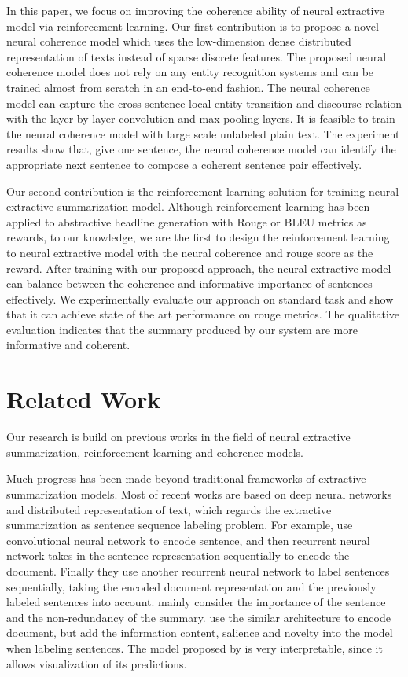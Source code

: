\documentclass[letterpaper]{article} %
\begin{document}
	In this paper, we focus on improving the coherence ability of neural extractive model via reinforcement learning. Our first contribution is to propose a novel neural coherence model which uses the low-dimension dense distributed representation of texts instead of sparse discrete features. The proposed neural coherence model does not rely on any entity recognition systems and can be trained almost from scratch in an end-to-end fashion. The neural coherence model can capture the cross-sentence local entity transition and discourse relation with the layer by layer convolution and max-pooling layers. It is feasible to train the neural coherence model with large scale unlabeled plain text. The experiment results show that, give one sentence, the neural coherence model can identify the appropriate next sentence to compose a coherent sentence pair effectively. 
	
	
	Our second contribution is the reinforcement learning solution for training neural extractive summarization model. Although reinforcement learning has been applied to abstractive headline generation with Rouge or BLEU metrics as rewards\cite{socher2017_summarization,ayana2016}, to our knowledge, we are the first to design the reinforcement learning to neural extractive model with the neural coherence and rouge score as the reward. After training with our proposed approach, the neural extractive model can balance between the coherence and informative importance of sentences effectively. We experimentally evaluate our approach on standard task and show that it can achieve state of the art performance on rouge metrics. The qualitative evaluation indicates that the summary produced by our system are more informative and coherent.
	
	
	\section{Related Work}
	Our research is build on previous works in the field of neural extractive summarization, reinforcement learning and coherence models.
	
	Much progress has been made beyond traditional frameworks of extractive summarization models. Most of recent works are based on deep neural networks and distributed representation of text, which regards the extractive summarization as sentence sequence labeling problem. For example, \cite{jianpeng2016} use convolutional neural network to encode sentence, and then recurrent neural network takes in the sentence representation sequentially to encode the document. Finally they use another recurrent neural network to label sentences sequentially, taking the encoded document representation and the previously labeled sentences into account. \cite{jianpeng2016} mainly consider the importance of the sentence and the non-redundancy of the summary. \cite{SummaRuNNer} use the similar architecture to encode document, but add the information content, salience and novelty into the model when labeling sentences. The model proposed by \cite{SummaRuNNer} is very interpretable, since it allows visualization of its predictions. 
	
\end{document}
